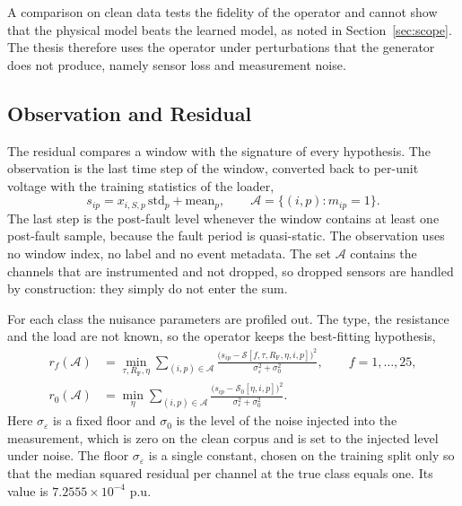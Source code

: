 \documentclass[MTech]{ugthesis}
\begin{document}
A comparison on clean data tests the fidelity of the operator and cannot show that the physical model beats the learned model, as noted in Section~\ref{sec:scope}. The thesis therefore uses the operator under perturbations that the generator does not produce, namely sensor loss and measurement noise.

\subsection{Observation and Residual}

The residual compares a window with the signature of every hypothesis. The observation is the last time step of the window, converted back to per-unit voltage with the training statistics of the loader,
\begin{equation}
s_{ip}=x_{i,S,p}\,\mathrm{std}_p+\mathrm{mean}_p,\qquad \mathcal{A}=\{(i,p):m_{ip}=1\}.
\label{eq:obs}
\end{equation}
The last step is the post-fault level whenever the window contains at least one post-fault sample, because the fault period is quasi-static. The observation uses no window index, no label and no event metadata. The set $\mathcal{A}$ contains the channels that are instrumented and not dropped, so dropped sensors are handled by construction: they simply do not enter the sum.

For each class the nuisance parameters are profiled out. The type, the resistance and the load are not known, so the operator keeps the best-fitting hypothesis,
\begin{align}
r_f(\mathcal{A})&=\min_{\tau,R_{\mathrm{F}},\eta}\sum_{(i,p)\in\mathcal{A}}\frac{\big(s_{ip}-\mathcal{S}[f,\tau,R_{\mathrm{F}},\eta,i,p]\big)^2}{\sigma_\varepsilon^2+\sigma_0^2},\qquad f=1,\dots,25, \label{eq:rf}\\
r_0(\mathcal{A})&=\min_{\eta}\sum_{(i,p)\in\mathcal{A}}\frac{\big(s_{ip}-\mathcal{S}_0[\eta,i,p]\big)^2}{\sigma_\varepsilon^2+\sigma_0^2}. \label{eq:r0}
\end{align}
Here $\sigma_\varepsilon$ is a fixed floor and $\sigma_0$ is the level of the noise injected into the measurement, which is zero on the clean corpus and is set to the injected level under noise. The floor $\sigma_\varepsilon$ is a single constant, chosen on the training split only so that the median squared residual per channel at the true class equals one. Its value is $7.2555\times10^{-4}$ p.u.
\end{document}
